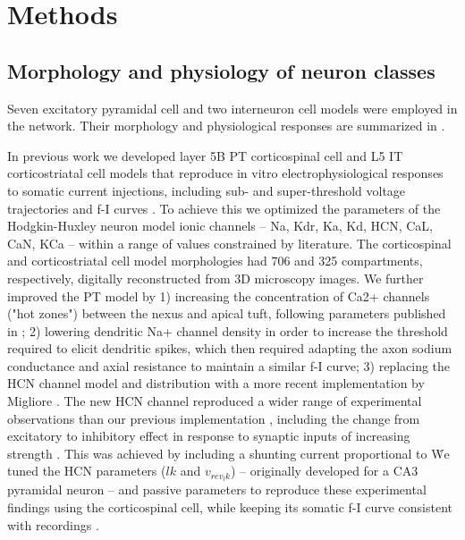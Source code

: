 \section{Methods}

\subsection{Morphology and physiology of neuron classes}

Seven excitatory pyramidal cell and two interneuron cell models were employed in the network. Their morphology and physiological responses are summarized in .

In previous work we developed layer 5B PT corticospinal cell and L5 IT corticostriatal cell models that reproduce in vitro electrophysiological responses to somatic current injections, including sub- and super-threshold voltage trajectories and f-I curves \cite{Neym17,Sute13}. To achieve this we optimized the parameters of the Hodgkin-Huxley neuron model ionic channels -- Na, Kdr, Ka, Kd, HCN, CaL, CaN, KCa -- within a range of values constrained by literature. The corticospinal and corticostriatal cell model morphologies had 706 and 325 compartments, respectively, digitally reconstructed from 3D microscopy images. We further improved the PT model by 1) increasing the concentration of Ca2+ channels ("hot zones") between the nexus and apical tuft, following parameters published in \cite{HayS11}; 2) lowering dendritic Na+ channel density in order to increase the threshold required to elicit dendritic spikes, which then required adapting the axon sodium conductance and axial resistance to maintain a similar f-I curve; 3) replacing the HCN channel model and distribution with a more recent implementation by Migliore \cite{Migl12}. The new HCN channel reproduced a wider range of experimental observations than our previous implementation \cite{Kole06}, including the change from excitatory to inhibitory effect in response to synaptic inputs of increasing strength \cite{Geor09}. This was achieved by including a shunting current proportional to \ih\. We tuned the HCN parameters ($lk$ and $v_{rev_lk}$) -- originally developed for a CA3 pyramidal neuron \cite{Migl12} -- and passive parameters to reproduce these experimental findings using the corticospinal cell, while keeping its somatic f-I curve consistent with recordings \cite{Sute13}. 


